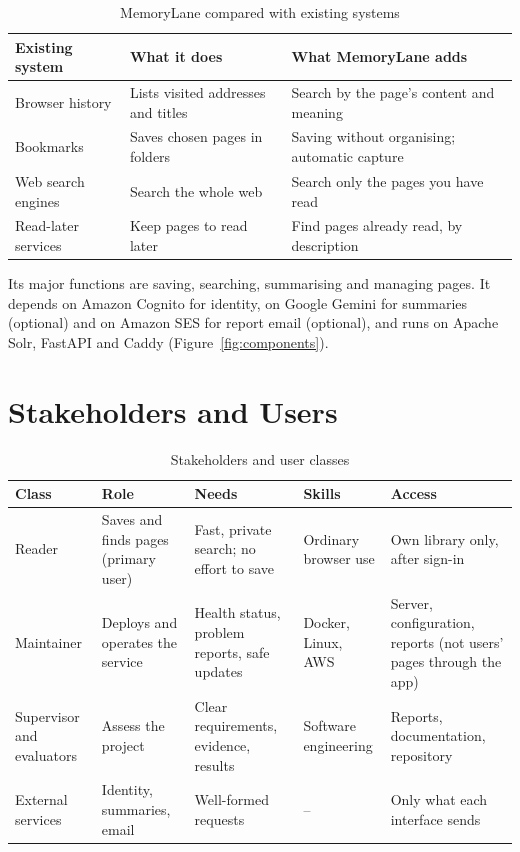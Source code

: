 \begin{table}[H]
\centering
\small
\begin{tabularx}{\textwidth}{>{\raggedright\arraybackslash}p{} L L}
\toprule
\textbf{Existing system} & \textbf{What it does} & \textbf{What MemoryLane adds} \\
\midrule
Browser history & Lists visited addresses and titles & Search by the page's content and meaning \\
Bookmarks & Saves chosen pages in folders & Saving without organising; automatic capture \\
Web search engines & Search the whole web & Search only the pages you have read \\
Read-later services & Keep pages to read later & Find pages already read, by description \\
\bottomrule
\end{tabularx}
\caption{MemoryLane compared with existing systems}
\label{tab:existing}
\end{table}

Its major functions are saving, searching, summarising and managing pages.
It depends on Amazon Cognito for identity, on Google Gemini for summaries
(optional) and on Amazon SES for report email (optional), and runs on
Apache Solr, FastAPI and Caddy (Figure~\ref{fig:components}).

\section{Stakeholders and Users}

\begin{table}[H]
\centering
\small
\begin{tabularx}{\textwidth}{>{\raggedright\arraybackslash}p{} L L L L}
\toprule
\textbf{Class} & \textbf{Role} & \textbf{Needs} & \textbf{Skills} & \textbf{Access} \\
\midrule
Reader & Saves and finds pages (primary user) & Fast, private search; no effort to save & Ordinary browser use & Own library only, after sign-in \\
Maintainer & Deploys and operates the service & Health status, problem reports, safe updates & Docker, Linux, AWS & Server, configuration, reports (not users' pages through the app) \\
Supervisor and evaluators & Assess the project & Clear requirements, evidence, results & Software engineering & Reports, documentation, repository \\
External services & Identity, summaries, email & Well-formed requests & -- & Only what each interface sends \\
\bottomrule
\end{tabularx}
\caption{Stakeholders and user classes}
\label{tab:stakeholders}
\end{table}

